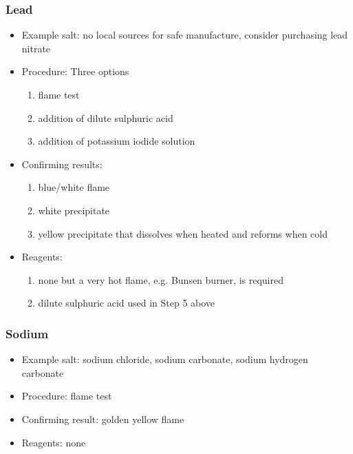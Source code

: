\subsubsection{Lead}
\begin{itemize}
\item{Example salt: no local sources for safe manufacture, 
consider purchasing lead nitrate}

\item{Procedure: Three options
\begin{enumerate}
\item{flame test} 
\item{addition of dilute sulphuric acid}
\item{addition of potassium iodide solution}
\end{enumerate}
} %

\item{Confirming results:
\begin{enumerate}
\item{blue/white flame}
\item{white precipitate}
\item{yellow precipitate that dissolves when heated and reforms when cold}
\end{enumerate}
} %

\item{Reagents:
\begin{enumerate}
\item{none but a very hot flame, e.g. Bunsen burner, is required} 
\item{dilute sulphuric acid used in Step 5 above}
\end{enumerate}
} %

\end{itemize} %

\subsubsection{Sodium}
\begin{itemize}
\item{Example salt: sodium chloride, 
sodium carbonate, 
sodium hydrogen carbonate}
\item{Procedure: flame test}
\item{Confirming result: golden yellow flame}
\item{Reagents: none}
\end{itemize}

